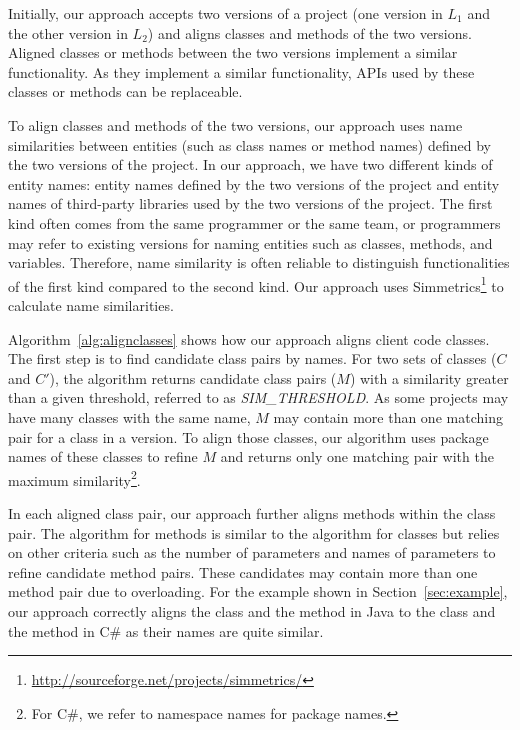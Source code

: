 Initially, our approach accepts two versions of a project (one version in 
$L_1$ and the other version in $L_2$) and aligns classes and methods
of the two versions. Aligned classes or methods 
between the two versions implement a similar functionality. As they
implement a similar functionality, APIs used by these classes or methods can be
replaceable.

To align classes and methods of the two versions, our approach uses
name similarities between entities (such as class names or method names)
defined by the two versions of the project. In our approach, we have two
different kinds of entity names: entity names defined by the two versions
of the project and entity names of third-party libraries used by the two versions of the project.
The first kind often comes from the same programmer or the same team, or
programmers may refer to existing versions for naming entities such
as classes, methods, and variables. Therefore, name similarity is often 
reliable to distinguish functionalities of the first kind compared to the second
kind. Our approach uses Simmetrics\footnote{\url{http://sourceforge.net/projects/simmetrics/}}
to calculate name similarities.

Algorithm~\ref{alg:alignclasses} shows how our approach aligns
client code classes. The first step is to find
candidate class pairs by names. For two sets of classes ($C$ and
$C'$), the algorithm returns candidate class pairs ($M$) with
a similarity greater than a given threshold, referred to as \emph{SIM\_THRESHOLD}. 
As some projects may have many classes with the
same name, $M$ may contain more than one matching pair for a class in a version. 
To align those classes, our algorithm uses package names of
these classes to refine $M$ and returns only one matching pair with the
maximum similarity\footnote{For C\#, we refer to namespace names for
package names.}.

In each aligned class pair, our approach further aligns methods
within the class pair. The algorithm for methods is similar to the
algorithm for classes but relies on other criteria such as the number of parameters
and names of parameters to refine candidate method pairs. These candidates
may contain more than one method pair due to overloading.
For the example shown in Section~\ref{sec:example}, our approach
correctly aligns the class  and the method
 in Java to the class 
and the method  in C\# as their names are quite
similar.
